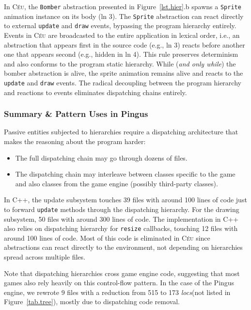\documentclass[times,twocolumn,final]{elsarticle}
\newcommand{\CEU}{\textsc{C\'{e}u}\xspace}
\newcommand{\locs}{\emph{locs}\xspace}
\newcommand{\code}[1] {{\small{\texttt{#1}}}}
\begin{document}
In \CEU, the \code{Bomber} abstraction presented in Figure~\ref{lst.hier}.b
spawns a \code{Sprite} animation instance on its body (ln 3).
%
The \code{Sprite} abstraction can react directly to external \code{update}
and \code{draw} events, bypassing the program hierarchy entirely.
Events in \CEU are broadcasted to the entire application in lexical order,
i.e., an abstraction that appears first in the source code (e.g., ln 3) reacts
before another one that appears second (e.g., hidden in ln 4).
This rule preserves determinism and also conforms to the program static
hierarchy.
While (\emph{and only while}) the bomber abstraction is alive, the sprite
animation remains alive and reacts to the \code{update} and \code{draw} events.
The radical decoupling between the program hierarchy and reactions to events
eliminates dispatching chains entirely.

\subsubsection{Summary \& Pattern Uses in Pingus}

Passive entities subjected to hierarchies require a dispatching architecture
that makes the reasoning about the program harder:

\begin{itemize}
\item The full dispatching chain may go through dozens of files.
\item The dispatching chain may interleave between classes specific to the game
      and also classes from the game engine (possibly third-party classes).
\end{itemize}

In C++, the update subsystem touches 39 files with around 100 lines of code
just to forward \code{update} methods through the dispatching hierarchy.
For the drawing subsystem, 50 files with around 300 lines of code.
The implementation in C++ also relies on dispatching hierarchy for
\code{resize} callbacks, touching 12 files with around 100 lines of code.
%
Most of this code is eliminated in \CEU since abstractions can react directly
to the environment, not depending on hierarchies spread across multiple files.

Note that dispatching hierarchies cross game engine code, suggesting that most
games also rely heavily on this control-flow pattern.
In the case of the Pingus engine, we rewrote 9 files with a reduction from 515
to 173 \locs (not listed in Figure~\ref{tab.tree}), mostly due to dispatching
code removal.
\end{document}
